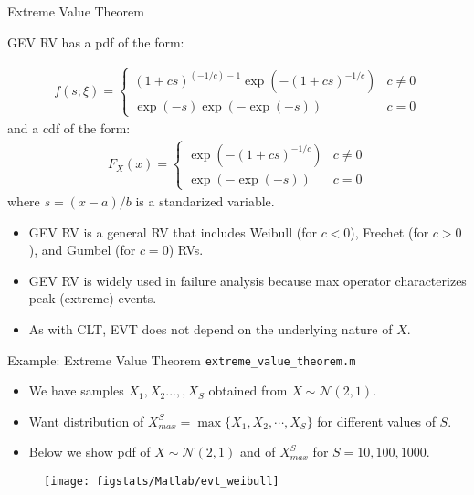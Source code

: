 \documentclass[9pt]{beamer}
\begin{document}
%
\begin{frame}{Extreme Value Theorem}

GEV RV has a pdf of the form:
\begin{block}{}
\begin{align*}
f(s;\xi) = \begin{cases}(1+c s)^{(-1/c)-1} \exp(-(1+c s)^{-1/c}) & c\neq0 \\
\exp(-s) \exp(-\exp(-s)) & c = 0\end{cases}
\end{align*}
and a cdf of the form:
\begin{align*}
F_X(x)= \begin{cases}\exp(-(1+c s)^{-1/c}) & c\neq0 \\ \exp(-\exp(-s)) & c = 0\end{cases}
\end{align*}
where $s=(x-a)/b$ is a standarized variable. 
\end{block}
\begin{itemize}
\setlength{\itemsep}{10pt}
\item GEV RV is a general RV that includes Weibull (for $c<0$), Frechet (for $c>0$), and Gumbel (for $c=0$) RVs. 

\item GEV RV is widely used in failure analysis because max operator characterizes peak (extreme) events. 

\item As with CLT,  EVT does not depend on the underlying nature of $X$. 

\end{itemize}


\end{frame}

%
\begin{frame}{Example: Extreme Value Theorem \footnotesize{\texttt{extreme\_value\_theorem.m}}}

\begin{itemize}
\setlength{\itemsep}{5pt}
\item We have samples $X_1,X_2...,,X_S$ obtained from $X\sim \mathcal{N}(2,1)$.
\item Want distribution of $X_{max}^S=\max\{X_1,X_2,\cdots, X_S\}$ for different values of $S$.
\item Below we show pdf of $X\sim \mathcal{N}(2,1)$ and of $X_{max}^S$ for $S=10,100,1000$.
\end{itemize}
\begin{figure}[!htb]
    \centering
	\texttt{[image: figstats/Matlab/evt\_weibull]}
\end{figure}

\end{frame}
\end{document}
